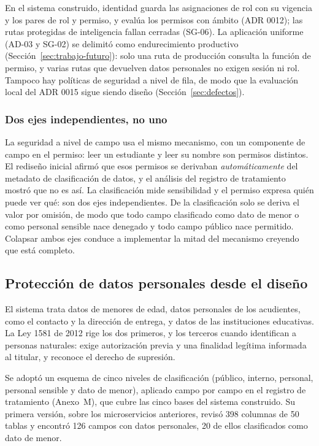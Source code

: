 En el sistema construido, identidad guarda las asignaciones de rol con su vigencia y los
pares de rol y permiso, y evalúa los permisos con ámbito (ADR 0012); las rutas protegidas
de inteligencia fallan cerradas (SG-06). La aplicación uniforme (AD-03 y SG-02) se delimitó como
endurecimiento productivo (Sección~\ref{sec:trabajo-futuro}): solo una ruta de producción consulta la función de permiso, y varias rutas que
devuelven datos personales no exigen sesión ni rol. Tampoco hay políticas de seguridad a
nivel de fila, de modo que la evaluación local del ADR 0015 sigue siendo diseño
(Sección~\ref{sec:defectos}).

\subsubsection{Dos ejes independientes, no uno}

La seguridad a nivel de campo usa el mismo mecanismo, con un componente de campo en el
permiso: leer un estudiante y leer su nombre son permisos distintos. El rediseño inicial
afirmó que esos permisos se derivaban \emph{automáticamente} del metadato de clasificación de
datos, y el análisis del registro de tratamiento mostró que no es así. La clasificación mide
sensibilidad y el permiso expresa quién puede ver qué: son dos ejes independientes. De la
clasificación solo se deriva el valor por omisión, de modo que todo campo clasificado como
dato de menor o como personal sensible nace denegado y todo campo público nace permitido.
Colapsar ambos ejes conduce a implementar la mitad del mecanismo creyendo que está completo.

\subsection{Protección de datos personales desde el diseño}
\label{sec:datos}

El sistema trata datos de menores de edad, datos personales de los acudientes, como el
contacto y la dirección de entrega, y datos de las instituciones educativas. La Ley 1581 de
2012 \citep{congreso_ley1581_2012} rige los dos primeros, y los terceros cuando identifican
a personas naturales: exige autorización previa y una finalidad legítima informada al
titular, y reconoce el derecho de supresión.

Se adoptó un esquema de cinco niveles de clasificación (público, interno, personal,
personal sensible y dato de menor), aplicado campo por campo en el registro de tratamiento
(Anexo~M), que cubre las cinco bases del sistema construido. Su primera versión, sobre los
microservicios anteriores, revisó 398 columnas de 50 tablas y encontró 126 campos con datos
personales, 20 de ellos clasificados como dato de menor.

